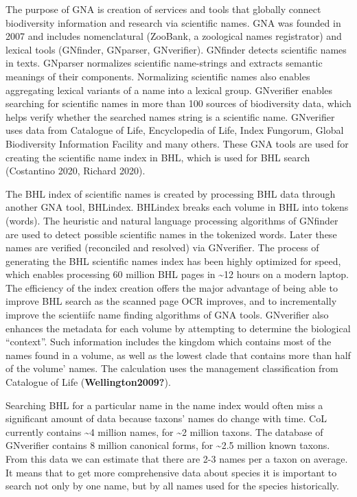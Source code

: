 \documentclass[
]{article}
\begin{document}
The purpose of GNA is creation of services and tools that globally
connect biodiversity information and research via scientific names. GNA
was founded in 2007 and includes nomenclatural (ZooBank, a zoological
names registrator) and lexical tools (GNfinder, GNparser, GNverifier).
GNfinder detects scientific names in texts. GNparser normalizes
scientific name-strings and extracts semantic meanings of their
components. Normalizing scientific names also enables aggregating
lexical variants of a name into a lexical group. GNverifier enables
searching for scientific names in more than 100 sources of biodiversity
data, which helps verify whether the searched names string is a
scientific name. GNverifier uses data from Catalogue of Life,
Encyclopedia of Life, Index Fungorum, Global Biodiversity Information
Facility and many others. These GNA tools are used for creating the
scientific name index in BHL, which is used for BHL search (Costantino
2020, Richard 2020).

The BHL index of scientific names is created by processing BHL data
through another GNA tool, BHLindex. BHLindex breaks each volume in BHL
into tokens (words). The heuristic and natural language processing
algorithms of GNfinder are used to detect possible scientific names in
the tokenized words. Later these names are verified (reconciled and
resolved) via GNverifier. The process of generating the BHL scientific
names index has been highly optimized for speed, which enables
processing 60 million BHL pages in \textasciitilde12 hours on a modern
laptop. The efficiency of the index creation offers the major advantage
of being able to improve BHL search as the scanned page OCR improves,
and to incrementally improve the scientiifc name finding algorithms of
GNA tools. GNverifier also enhances the metadata for each volume by
attempting to determine the biological ``context''. Such information
includes the kingdom which contains most of the names found in a volume,
as well as the lowest clade that contains more than half of the volume'
names. The calculation uses the management classification from Catalogue
of Life (\textbf{Wellington2009?}).

Searching BHL for a particular name in the name index would often miss a
significant amount of data because taxons' names do change with time.
CoL currently contains \textasciitilde4 million names, for
\textasciitilde2 million taxons. The database of GNverifier contains 8
million canonical forms, for \textasciitilde2.5 million known taxons.
From this data we can estimate that there are 2-3 names per a taxon on
average. It means that to get more comprehensive data about species it
is important to search not only by one name, but by all names used for
the species historically.
\end{document}
